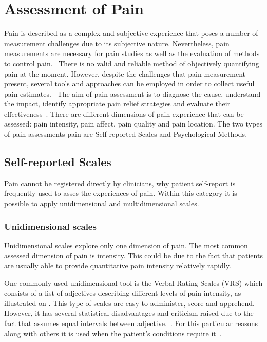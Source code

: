 \section{Assessment of Pain}
Pain is described as a complex and subjective experience that poses a number of measurement challenges due to its subjective nature. Nevertheless, pain measurements are necessary for pain studies as well as the evaluation of methods to control pain.~\cite{Jensen2001}
There is no valid and reliable method of objectively quantifying pain at the moment. However, despite the challenges that pain measurement present, several tools and approaches can be employed in order to collect useful pain estimates.~\cite{Younger2010} The aim of pain assessment is to diagnose the cause, understand the impact, identify appropriate pain relief strategies and evaluate their effectiveness~\cite{Briggs2010}. There are different dimensions of pain experience that can be assessed: pain intensity, pain affect, pain quality and pain location. The two types of pain assessments pain are Self-reported Scales and Psychological Methods. 

\subsection{Self-reported Scales}
Pain cannot be registered directly by clinicians, why patient self-report is frequently used to asses the experiences of pain. Within this category it is possible to apply unidimensional and multidimensional scales.~\cite{Jensen2001}

\subsubsection{Unidimensional scales}
Unidimensional scales explore only one dimension of pain. The most common assessed dimension of pain is intensity. This could be due to the fact that patients are usually able to provide quantitative pain intensity relatively rapidly.~\cite{Jensen2001}

One commonly used unidimensional tool is the Verbal Rating Scales (VRS) which consists of a list of adjectives describing different levels of pain intensity, as illustrated on . This type of scales are easy to administer, score and apprehend. However, it has several statistical disadvantages and criticism raised due to the fact that assumes equal intervals between adjective.~\cite{Jensen2001}. For this particular reasons along with others it is used when the patient's conditions require it~\cite{Jensen1986}. 


